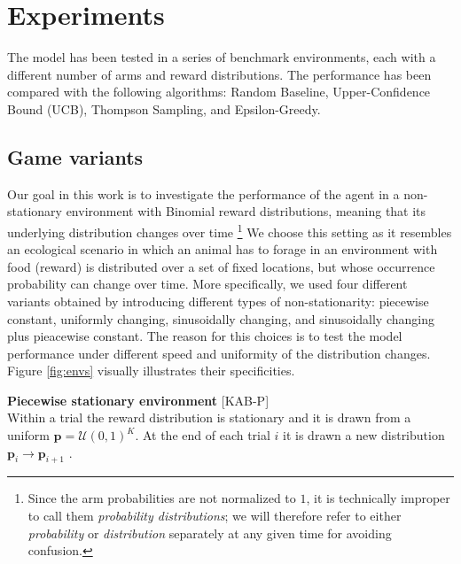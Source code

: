 \section{Experiments}

The model has been tested in a series of benchmark environments, each with a different number of arms and reward distributions. The performance has been compared with the following algorithms: Random Baseline, Upper-Confidence Bound (UCB), Thompson Sampling, and Epsilon-Greedy.

\subsection{Game variants} %

\noindent Our goal in this work is to investigate the performance of the agent in a non-stationary environment with Binomial reward distributions, meaning that its underlying distribution changes over time \footnote{Since the arm probabilities are not normalized to $1$, it is
technically improper to call them \textit{probability distributions}; we will therefore refer to either \textit{probability} or \textit{distribution} separately at any given time for avoiding confusion.}
We choose this setting as it resembles an ecological scenario in which an animal has to forage in an environment with food (reward) is distributed over a set of fixed locations, but whose occurrence probability can change over time.
More specifically, we used four different variants obtained by introducing different types of non-stationarity: piecewise constant, uniformly changing, sinusoidally changing, and sinusoidally changing plus pieacewise constant.
The reason for this choices is to test the model performance under different speed and uniformity of the distribution changes.
Figure \ref{fig:envs} visually illustrates their specificities.

\hfill \break
\noindent \textbf{Piecewise stationary environment} [\textsc{KAB-P}]\\ Within a trial the reward distribution is stationary and it is drawn from a uniform $\mathbf{p}=\mathcal{U}(0, 1)^{K}$. At the end of each trial $i$ it is drawn a new distribution $\mathbf{\mathbf{p}}_{i} \to \mathbf{\mathbf{p}}_{i+1}$ \cite{qiForcedExplorationBandit2023}.

